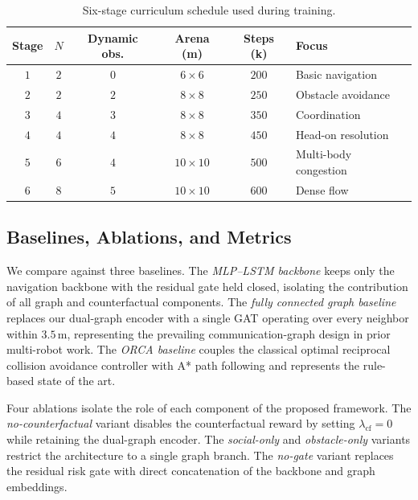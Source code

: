 \documentclass[journal,twoside,web]{ieeecolor}
\begin{document}
\begin{table}[t]
\centering
\caption{Six-stage curriculum schedule used during training.}
\label{tab:curriculum}
\renewcommand{\arraystretch}{1.05}
\setlength{\tabcolsep}{4pt}
\begin{tabularx}{\columnwidth}{c c c c c X}
\toprule
Stage & $N$ & Dynamic obs. & Arena (m) & Steps (k) & Focus \\
\midrule
$1$ & $2$ & $0$ & $6\!\times\!6$  & $200$ & Basic navigation \\
$2$ & $2$ & $2$ & $8\!\times\!8$  & $250$ & Obstacle avoidance \\
$3$ & $4$ & $3$ & $8\!\times\!8$  & $350$ & Coordination \\
$4$ & $4$ & $4$ & $8\!\times\!8$  & $450$ & Head-on resolution \\
$5$ & $6$ & $4$ & $10\!\times\!10$ & $500$ & Multi-body congestion \\
$6$ & $8$ & $5$ & $10\!\times\!10$ & $600$ & Dense flow \\
\bottomrule
\end{tabularx}
\end{table}

\subsection{Baselines, Ablations, and Metrics}
\label{sec:setup_baselines}

We compare against three baselines. The \emph{MLP--LSTM backbone} keeps only the navigation backbone with the residual gate held closed, isolating the contribution of all graph and counterfactual components. The \emph{fully connected graph baseline} replaces our dual-graph encoder with a single GAT operating over every neighbor within $3.5$\,m, representing the prevailing communication-graph design in prior multi-robot work. The \emph{ORCA baseline} couples the classical optimal reciprocal collision avoidance controller with A* path following and represents the rule-based state of the art.

Four ablations isolate the role of each component of the proposed framework. The \emph{no-counterfactual} variant disables the counterfactual reward by setting $\lambda_{\text{cf}}=0$ while retaining the dual-graph encoder. The \emph{social-only} and \emph{obstacle-only} variants restrict the architecture to a single graph branch. The \emph{no-gate} variant replaces the residual risk gate with direct concatenation of the backbone and graph embeddings.
\end{document}
